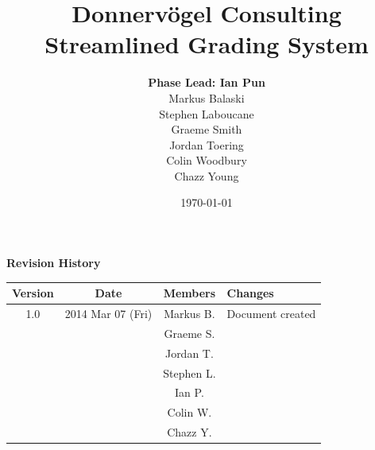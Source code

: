 \documentclass{article}
\begin{document}
\title{Donnervögel Consulting \\ Streamlined Grading System}
\author{\textbf{Phase Lead: Ian Pun} \\ Markus Balaski \\ Stephen Laboucane \\
  Graeme Smith \\ Jordan Toering \\  Colin Woodbury \\ Chazz Young}
\date{\today}
\maketitle
\clearpage

\textbf{Revision History}
\begin{center}
  \begin{tabular}{| c | c | c | l |}
    \hline
    Version & Date & Members & Changes\\
    \hline
    1.0 & 2014 Mar 07 (Fri) & Markus B. & Document created\\
    & & Graeme S. & \\
    & & Jordan T. & \\
    & & Stephen L. & \\
    & & Ian P. & \\
    & & Colin W. & \\
    & & Chazz Y. & \\
    \hline
  \end{tabular}
\end{center}
\clearpage

\tableofcontents
\clearpage

\end{document}
